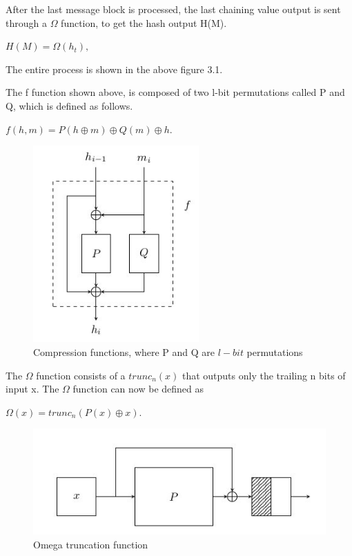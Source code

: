   After the last message block is processed, the last chaining value output is sent through a $\Omega$ function, to get
  the hash output H(M).

  $H(M) = \Omega(h_{t}),$

  The entire process is shown in the above figure 3.1.

  The f function shown above, is composed of two l-bit permutations called P and Q, which is defined as follows.

  $f(h, m) = P(h \oplus m) \oplus Q(m) \oplus h.$
  
  \begin{figure}[h]
    \begin{center}
      \includegraphics[width=2.5in]{groestlPQfunction.jpg}
    \end{center}
    \caption{Compression functions, where P and Q are $l-bit$ permutations}
    \label{fig:lab}
  \end{figure}

  The $\Omega$ function consists of a $trunc_{n}(x)$ that outputs only the trailing n bits of input x. The $\Omega$ function
  can now be defined as 

  $\Omega(x) = trunc_{n}( P(x) \oplus x ).$

  \begin{figure}[h]
    \begin{center}
      \includegraphics[width=4.5in]{groestlomegafunction.jpg}
    \end{center}
    \caption{Omega truncation function}
    \label{fig:lab}
  \end{figure}

